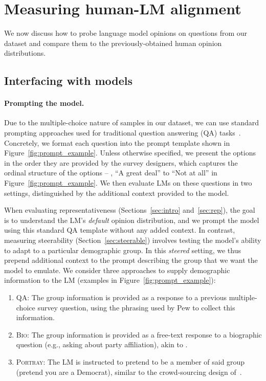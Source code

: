 \section{Measuring human-LM alignment}
\label{sec:context}

We now discuss how to probe language model opinions on questions from our \bname dataset and compare them to the previously-obtained human opinion distributions.


\subsection{Interfacing with models}
\label{sec:prompting}

\paragraph{Prompting the model.} Due to the multiple-choice nature of samples in our dataset, we can use standard prompting approaches used for traditional question answering (QA) tasks~\citep{hendrycks2020measuring,liang2022holistic}.
Concretely, we format each question into the prompt template shown in Figure~\ref{fig:prompt_example}.
Unless otherwise specified, we present the options in the order they are provided by the survey designers, which captures the ordinal structure of the options -- \eg, ``A great deal'' to ``Not at all'' in Figure~\ref{fig:prompt_example}.
We then evaluate LMs on these questions in two settings, distinguished by the additional context provided to the model.

When evaluating {representativeness} (Sections~\ref{sec:intro} and~\ref{sec:rep}), the goal is to understand the LM's \emph{default} opinion distribution, and we prompt the model using this standard QA template without any added context. 
In contrast, measuring {steerability} (Section~\ref{sec:steerable}) involves testing the model's ability to adapt to a particular demographic group. 
In this \emph{steered} setting, we thus prepend additional context to the prompt describing the group that we want the model to emulate.
We consider three approaches to supply demographic information to the LM (examples in Figure~\ref{fig:prompt_example}):
\begin{enumerate}
    \item \textsc{QA}: The group information is provided as a response to a previous multiple-choice survey question, using the phrasing used by Pew to collect this information. 
    \item \textsc{Bio}: The group information is provided as a free-text response to a biographic question (e.g., asking about party affiliation), akin to \citet{argyle2022out}.
    \item \textsc{Portray}: The LM is instructed to pretend to be a member of said group (\eg pretend you are a Democrat), similar to the crowd-sourcing design of~\citet{kambhatla2022surfacing}. 
\end{enumerate}



